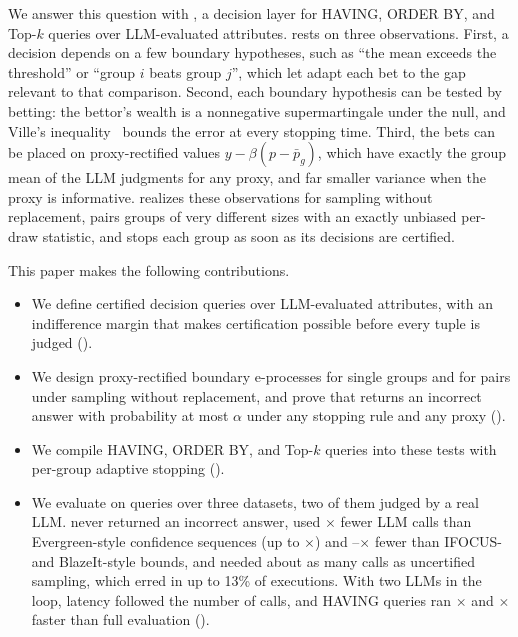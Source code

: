 We answer this question with \sys{}, a decision layer for HAVING, ORDER BY, and Top-$k$ queries over LLM-evaluated attributes.
\sys{} rests on three observations.
First, a decision depends on a few boundary hypotheses, such as ``the mean exceeds the threshold'' or ``group $i$ beats group $j$'', which let \sys{} adapt each bet to the gap relevant to that comparison.
Second, each boundary hypothesis can be tested by betting: the bettor's wealth is a nonnegative supermartingale under the null, and Ville's inequality~\cite{ville1939} bounds the error at every stopping time.
Third, the bets can be placed on proxy-rectified values $y-\beta(p-\bar p_g)$, which have exactly the group mean of the LLM judgments for any proxy, and far smaller variance when the proxy is informative.
\sys{} realizes these observations for sampling without replacement, pairs groups of very different sizes with an exactly unbiased per-draw statistic, and stops each group as soon as its decisions are certified.

This paper makes the following contributions.
\begin{itemize}
\item We define certified decision queries over LLM-evaluated attributes, with an indifference margin that makes certification possible before every tuple is judged ().
\item We design proxy-rectified boundary e-processes for single groups and for pairs under sampling without replacement, and prove that \sys{} returns an incorrect answer with probability at most $\alpha$ under any stopping rule and any proxy ().
\item We compile HAVING, ORDER BY, and Top-$k$ queries into these tests with per-group adaptive stopping ().
\item We evaluate \sys{} on \numNQ{} queries over three datasets, two of them judged by a real LLM. \sys{} never returned an incorrect answer, used \numRWSR$\times$ fewer LLM calls than Evergreen-style confidence sequences (up to \numRWSRMAX$\times$) and \numRHS--\numRBSP$\times$ fewer than IFOCUS- and BlazeIt-style bounds, and needed about as many calls as uncertified sampling, which erred in up to 13\% of executions. With two LLMs in the loop, latency followed the number of calls, and HAVING queries ran \numLiveHavingMin$\times$ and \numLiveHavingMax$\times$ faster than full evaluation ().
\end{itemize}
